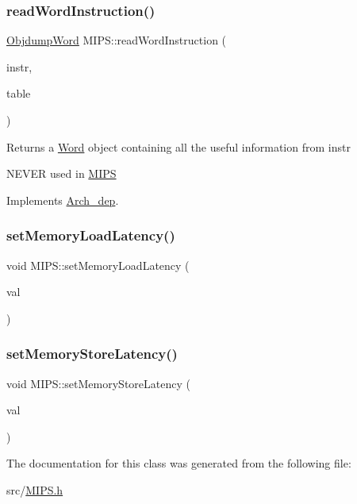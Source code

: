 \mbox{\label{classMIPS_a28a3d7f0cc8a69881d46dfa1363351cf}} 
\subsubsection{\texorpdfstring{read\+Word\+Instruction()}{readWordInstruction()}}
{\footnotesize\ttfamily \hyperlink{classObjdumpWord}{Objdump\+Word} M\+I\+P\+S\+::read\+Word\+Instruction (\begin{DoxyParamCaption}\item[{const \hyperlink{classObjdumpInstruction}{Objdump\+Instruction} \&}]{instr,  }\item[{\hyperlink{classObjdumpSymbolTable}{Objdump\+Symbol\+Table} \&}]{table }\end{DoxyParamCaption})\hspace{0.3cm}{\ttfamily [virtual]}}

Returns a \hyperlink{classWord}{Word} object containing all the useful information from instr

N\+E\+V\+ER used in \hyperlink{classMIPS}{M\+I\+PS} 

Implements \hyperlink{classArch__dep_a9e6075dd5bc43a1522aa65f2d11dad06}{Arch\+\_\+dep}.

\mbox{\label{classMIPS_ab6fbe5813d16f00c5a66c28211b4eec5}} 
\subsubsection{\texorpdfstring{set\+Memory\+Load\+Latency()}{setMemoryLoadLatency()}}
{\footnotesize\ttfamily void M\+I\+P\+S\+::set\+Memory\+Load\+Latency (\begin{DoxyParamCaption}\item[{int}]{val }\end{DoxyParamCaption})}

\mbox{\label{classMIPS_a2c58b6b1405f9fa38305e2b064ed83b8}} 
\subsubsection{\texorpdfstring{set\+Memory\+Store\+Latency()}{setMemoryStoreLatency()}}
{\footnotesize\ttfamily void M\+I\+P\+S\+::set\+Memory\+Store\+Latency (\begin{DoxyParamCaption}\item[{int}]{val }\end{DoxyParamCaption})}



The documentation for this class was generated from the following file\+:\begin{DoxyCompactItemize}
\item 
src/\hyperlink{MIPS_8h}{M\+I\+P\+S.\+h}\end{DoxyCompactItemize}
